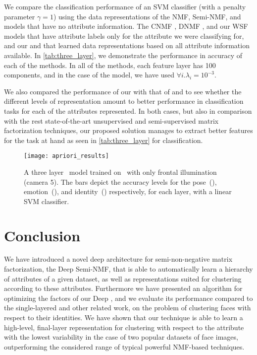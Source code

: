 \documentclass[10pt,journal,compsoc]{IEEEtran}
\begin{document}
We compare the classification performance of an SVM classifier (with a penalty parameter $\gamma = 1$) using the data representations of the NMF, Semi-NMF, and \deepseminmf models that have no attribute information. The CNMF \cite{Liu2012}, DNMF \cite{Kotsia2007}, and our WSF models that have attribute labels only for the attribute we were classifying for,  and our \mawsf{} and \dwsf{} that learned data representations based on all attribute information available. In \autoref{tab:three_layer}, we demonstrate the performance in accuracy of each of the methods. In all of the methods, each feature layer has 100 components, and in the case of the \dwsf{} model, we have used $\forall i . \lambda_i = 10^{-3}$. 

We also compared the performance of our \dwsf with that of \wsf and \mawsf to see whether the different levels of representation amount to better performance in classification tasks for each of the attributes represented.  In both cases, but also in comparison with the rest state-of-the-art unsupervised and semi-supervised matrix factorization techniques, our proposed solution manages to extract better features for the task at hand as seen in \autoref{tab:three_layer} for classification.
\begin{figure}[hptb]
  \centering
  \texttt{[image: apriori\_results]}
  \caption{A three layer \dwsf~model trained on \cmupie~with only frontal illumination (camera 5). The bars depict the accuracy levels for the pose~(), emotion~(), and identity~() respectively, for each layer, with a linear SVM classifier.}
  \label{fig:apriori_results}
\end{figure}
\section{Conclusion} %
\label{sec:conclusion}
We have introduced a novel deep architecture for semi-non-negative matrix factorization, the Deep Semi-NMF, that is able to automatically learn a hierarchy of attributes of a given dataset, as well as
representations suited for clustering according to these attributes. Furthermore we have presented an algorithm for optimizing the factors of our Deep \seminmf, and we evaluate its performance compared to
the single-layered \seminmf and other related work, on the problem of clustering faces with respect to their identities. We have shown that our technique is able to learn a high-level, final-layer
representation for clustering with respect to the attribute with the lowest variability in the case of two popular datasets of face images, outperforming the considered range of typical powerful NMF-based techniques.
\end{document}
